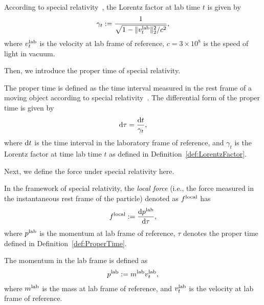 \begin{definition}
\label{def:LorentzFactor}
According to special relativity~\cite{e+05}, the Lorentz factor at lab time $t$ is given by
\begin{align*}
\gamma_t := \frac{1}{\sqrt{1 - {\|v_t^{\rm lab}\|_2^2}/{c^2}}},
\end{align*}
where $v_t^{\rm lab}$ is the velocity at lab frame of reference, $c = 3 \times 10^8$ is the speed of light in vacuum.
\end{definition}

Then, we introduce the proper time of special relativity.

\begin{definition}
\label{def:ProperTime}
The proper time is defined as the time interval measured in the rest frame of a moving object according to special relativity~\cite{e+05}. The differential form of the proper time is given by
\begin{align*}
    \mathrm{d} \tau = \frac{\mathrm{d} t}{\gamma_t},
\end{align*}
where $\mathrm{d} t$ is the time interval in the laboratory frame of reference, and $\gamma_t$ is the Lorentz factor at time lab time $t$ as defined in Definition~\ref{def:LorentzFactor}.
\end{definition}

Next, we define the force under special relativity here.

\begin{definition}
\label{def:RelativisticForce}
In the framework of special relativity, the \emph{local force} (i.e., the force measured in the instantaneous rest frame of the particle) denoted as $f^{\rm local}$ has
\begin{align}
    f^{\rm local} := \frac{\mathrm{d} p^{\rm lab}}{\mathrm{d} \tau}, \label{eq:f_local}
\end{align}
where $p^{\rm lab}$ is the momentum at lab frame of reference, $\tau$ denotes the proper time defined in Definition~\ref{def:ProperTime}.

The momentum in the lab frame is defined as
\begin{align}
    p^{\rm lab} := m^{\rm lab} v_t^{\rm lab}, \label{eq:p}
\end{align}
where $m^{\rm lab}$ is the mass at lab frame of reference, and $v_t^{\rm lab}$ is the velocity at lab frame of reference.
\end{definition}

